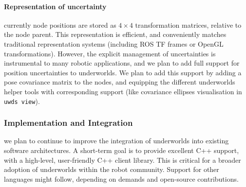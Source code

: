 \documentclass[letterpaper, 10pt, conference]{ieeeconf}
\newcommand{\uwds}{{\sc underworlds}\xspace}
\begin{document}
\paragraph*{Representation of uncertainty} currently node positions are 
stored as $4\times4$ transformation matrices, relative to the node parent. This
representation is efficient, and conveniently matches traditional representation
systems (including ROS TF frames or OpenGL transformations). However, the explicit management
of uncertainties is instrumental to many robotic applications, and we plan to
add full support for position uncertainties to \uwds. We plan to add this
support by adding a pose covariance matrix to the nodes, and equipping the
different \uwds helper tools with corresponding support (like covariance
ellipses visualisation in {\tt uwds view}).



\subsubsection{Implementation and Integration} we plan to continue to
improve the integration of \uwds into existing software architectures. A
short-term goal is to provide excellent C++ support, with a high-level,
user-friendly C++ client library. This is critical for a broader adoption of \uwds
within the robot community. Support for other languages might follow, depending
on demands and open-source contributions.

\end{document}
